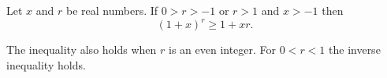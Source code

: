 \documentclass[12pt]{article}
\begin{document}
Let $x$ and $r$ be real numbers.
If\; $0>r>-1$ or $r>1$ and $x>-1$ then
$$(1+x)^r\ge 1+xr.$$
\smallskip

The inequality also holds when $r$ is an even integer.
For $0<r<1$ the inverse inequality holds.
\end{document}
